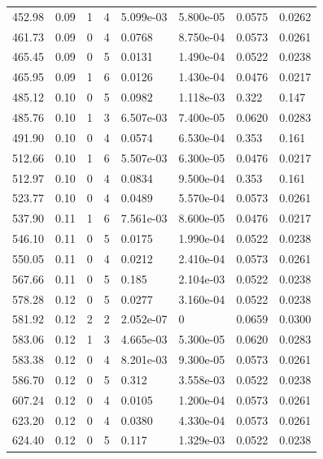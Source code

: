 \documentclass[preview]{standalone}
\begin{document}
{{{\begin{tabular}{L{1.2cm}C{1.2cm} C{0.3cm}C{0.5cm} C{1.4cm}C{1.4cm} C{1.4cm}C{1.4cm}}
  452.98  &  0.09  & 1     &  4 &  5.099e-03  & 5.800e-05  & 0.0575 &  0.0262   \\ 
  461.73  &  0.09  & 0     &  4 &  0.0768  & 8.750e-04  & 0.0573 &  0.0261   \\ 
  465.45  &  0.09  & 0     &  5 &  0.0131  & 1.490e-04  & 0.0522 &  0.0238   \\ 
  465.95  &  0.09  & 1     &  6 &  0.0126  & 1.430e-04  & 0.0476 &  0.0217   \\ 
  485.12  &  0.10  & 0     &  5 &  0.0982  & 1.118e-03  & 0.322 &  0.147   \\ 
  485.76  &  0.10  & 1     &  3 &  6.507e-03  & 7.400e-05  & 0.0620 &  0.0283   \\ 
  491.90  &  0.10  & 0     &  4 &  0.0574  & 6.530e-04  & 0.353 &  0.161   \\ 
  512.66  &  0.10  & 1     &  6 &  5.507e-03  & 6.300e-05  & 0.0476 &  0.0217   \\ 
  512.97  &  0.10  & 0     &  4 &  0.0834  & 9.500e-04  & 0.353 &  0.161   \\ 
  523.77  &  0.10  & 0     &  4 &  0.0489  & 5.570e-04  & 0.0573 &  0.0261   \\ 
  537.90  &  0.11  & 1     &  6 &  7.561e-03  & 8.600e-05  & 0.0476 &  0.0217   \\ 
  546.10  &  0.11  & 0     &  5 &  0.0175  & 1.990e-04  & 0.0522 &  0.0238   \\ 
  550.05  &  0.11  & 0     &  4 &  0.0212  & 2.410e-04  & 0.0573 &  0.0261   \\ 
  567.66  &  0.11  & 0     &  5 &  0.185  & 2.104e-03  & 0.0522 &  0.0238   \\ 
  578.28  &  0.12  & 0     &  5 &  0.0277  & 3.160e-04  & 0.0522 &  0.0238   \\ 
  581.92  &  0.12  & 2     &  2 &  2.052e-07  & 0  & 0.0659 &  0.0300   \\ 
  583.06  &  0.12  & 1     &  3 &  4.665e-03  & 5.300e-05  & 0.0620 &  0.0283   \\ 
  583.38  &  0.12  & 0     &  4 &  8.201e-03  & 9.300e-05  & 0.0573 &  0.0261   \\ 
  586.70  &  0.12  & 0     &  5 &  0.312  & 3.558e-03  & 0.0522 &  0.0238   \\ 
  607.24  &  0.12  & 0     &  4 &  0.0105  & 1.200e-04  & 0.0573 &  0.0261   \\ 
  623.20  &  0.12  & 0     &  4 &  0.0380  & 4.330e-04  & 0.0573 &  0.0261   \\ 
  624.40  &  0.12  & 0     &  5 &  0.117  & 1.329e-03  & 0.0522 &  0.0238   \\ 

\end{tabular}}}}
\end{document}
